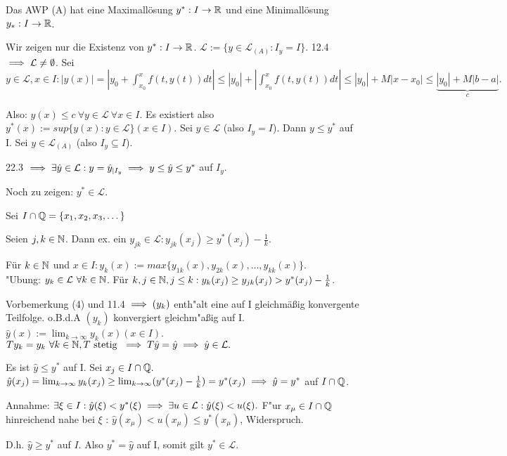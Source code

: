 \documentclass[a4paper,twoside,DIV15,BCOR12mm]{scrbook}
\begin{document}
\begin{satz}
Das AWP (A) hat eine Maximallösung $y^*: I \to \mathbb{R}$ und eine Minimallösung $y_*:I \to \mathbb{R}$.
\end{satz}

\begin{beweis}
Wir zeigen nur die Existenz von $y^* : I \to \mathbb{R}$.
  $\mathcal{L} := \{ y \in \mathcal{L}_{(A)} : I_y = I\}$. 12.4 $\implies \mathcal{L} \neq \emptyset$.
Sei $y \in \mathcal{L}, x \in I : |y(x)| = |y_0 + \int_{x_0}^{x} f(t,y(t)) dt| \leq |y_0| + | \int_{x_0}^{x} f(t,y(t)) dt|
\leq |y_0| + M |x-x_0| \leq \underbrace{|y_0| + M | b-a |}_{c}.$

Also: $y(x) \leq c \ \forall y \in \mathcal{L} \ \forall x \in I.$ 
Es existiert also $y^*(x) := sup \{ y(x) : y \in \mathcal{L} \} (x \in I).$
Sei $y \in  \mathcal{L}$ (also $I_y = I$). Dann $y \leq y^*$ auf I. Sei $y \in \mathcal{L}_{(A)}$ (also $I_y \subseteq I$). 

22.3 $\implies \exists \hat{y} \in \mathcal{L}: y = \hat{y}_{|I_y} \implies y \leq \hat{y} \leq y^*$ auf $I_y$.

Noch zu zeigen: $y^* \in \mathcal{L}.$

Sei $I \cap \mathbb{Q} = \{ x_1,x_2,x_3, \dots \} $

Seien $j,k \in \mathbb{N}$. Dann ex. ein $y_{jk} \in \mathcal{L}: y_{jk}(x_j) \geq y^*(x_j) - \frac{1}{k}.$

Für $k \in \mathbb{N}$ und $x\in I: y_k(x) := max\{y_{1k}(x),y_{2k}(x),\dots, y_{kk}(x)\}. $\\ "Ubung: $y_k \in \mathcal{L} \ \forall k \in \mathbb{N}$.
Für $k,j  \in \mathbb{N}, j \leq k: y_k(x_j) \geq  y_{jk}(x_j) > y^*(x_j) - \frac{1}{k}$.

Vorbemerkung (4) und 11.4 $\implies (y_k)$ enth"alt eine auf I gleichmäßig konvergente Teilfolge. o.B.d.A $(y_k)$ konvergiert gleichm"aßig auf I.
$\hat{y}(x) := \lim_{k \to \infty} y_k(x) ( x \in I )$.
 $T y_k = y_k \ \forall k \in \mathbb{N}, T\text{ stetig }\implies T \hat{y} = \hat{y} \implies \hat{y} \in \mathcal{L}.$
 
Es ist $\hat{y} \leq  y^*$ auf I. Sei $x_j \in I \cap \mathbb{Q}.$
$\hat{y}(x_j) = \lim_{k \to \infty} y_k(x_j) \geq  \lim_{k \to \infty} (y^*(x_j)-\frac{1}{k}) = y^*(x_j) \implies 
\hat{y} = y^*$ auf $I\cap \mathbb{Q}$.

Annahme: $\exists \xi \in I: \hat{y}(\xi) < y^*(\xi) \implies \exists u \in \mathcal{L} : \hat{y}(\xi) < u(\xi).$
F"ur $x_{\mu} \in I \cap \mathbb{Q}$ hinreichend nahe bei $\xi$ : $\hat{y}(x_{\mu}) < u(x_{\mu}) \leq y^*(x_{\mu})$, Widerspruch.

D.h. $\hat{y} \geq y^*$ auf $I$. Also $y^* = \hat{y}$ auf I,  somit gilt $ y^* \in \mathcal{L}.$
\end{beweis}
\end{document}
